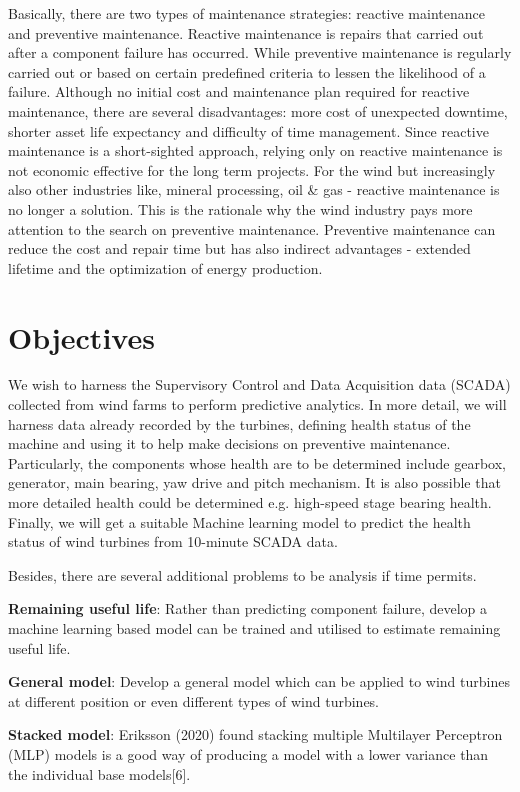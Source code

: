 \documentclass[english,a4paper,11pt]{article}
\begin{document}
Basically, there are two types of maintenance strategies: reactive maintenance and preventive maintenance. Reactive maintenance is repairs that carried out after a component failure has occurred. While preventive maintenance is regularly carried out or based on certain predefined criteria to lessen the likelihood of a failure. Although no initial cost and maintenance plan required for reactive maintenance, there are several disadvantages: more cost of unexpected downtime, shorter asset life expectancy and difficulty of time management. Since reactive maintenance is a short-sighted approach, relying only on reactive maintenance is not economic effective for the long term projects. For the wind but increasingly also other industries like, mineral processing, oil \& gas - reactive maintenance is no longer a solution. This is the rationale why the wind industry pays more attention to the search on preventive maintenance. Preventive maintenance can reduce the cost and repair time but has also indirect advantages - extended lifetime and the optimization of energy production.

\section{Objectives}
We wish to harness the Supervisory Control and Data Acquisition data (SCADA) collected from wind farms to perform predictive analytics. In more detail, we will harness data already recorded by the turbines, defining health status of the machine and using it to help make decisions on preventive maintenance. Particularly, the components whose health are to be determined include gearbox, generator, main bearing, yaw drive and pitch mechanism. It is also possible that more detailed health could be determined e.g. high-speed stage bearing health. Finally, we will get a suitable Machine learning model to predict the health status of wind turbines from 10-minute SCADA data. 

Besides, there are several additional problems to be analysis if time permits. 

\textbf{Remaining useful life}: Rather than predicting component failure, develop a machine learning based model can be trained and utilised to estimate remaining useful life.

\textbf{General model}: Develop a general model which can be applied to wind turbines at different position or even different types of wind turbines. 

\textbf{Stacked model}: Eriksson (2020) found stacking multiple Multilayer Perceptron (MLP) models is a good way of producing a model with a lower variance than the individual base models[6].
\end{document}
